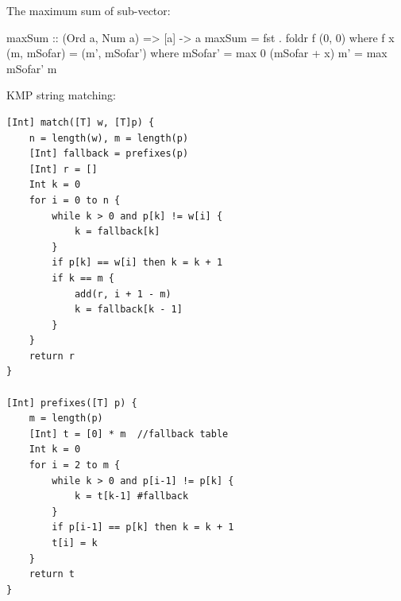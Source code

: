 \documentclass[b5paper]{article}
\begin{document}
The maximum sum of sub-vector:

\begin{Haskell}
maxSum :: (Ord a, Num a) => [a] -> a
maxSum = fst . foldr f (0, 0) where
  f x (m, mSofar) = (m', mSofar') where
    mSofar' = max 0 (mSofar + x)
    m' = max mSofar' m
\end{Haskell}

KMP string matching:

\begin{lstlisting}[language = Bourbaki]
[Int] match([T] w, [T]p) {
    n = length(w), m = length(p)
    [Int] fallback = prefixes(p)
    [Int] r = []
    Int k = 0
    for i = 0 to n {
        while k > 0 and p[k] != w[i] {
            k = fallback[k]
        }
        if p[k] == w[i] then k = k + 1
        if k == m {
            add(r, i + 1 - m)
            k = fallback[k - 1]
        }
    }
    return r
}

[Int] prefixes([T] p) {
    m = length(p)
    [Int] t = [0] * m  //fallback table
    Int k = 0
    for i = 2 to m {
        while k > 0 and p[i-1] != p[k] {
            k = t[k-1] #fallback
        }
        if p[i-1] == p[k] then k = k + 1
        t[i] = k
    }
    return t
}
\end{lstlisting}




\end{document}
